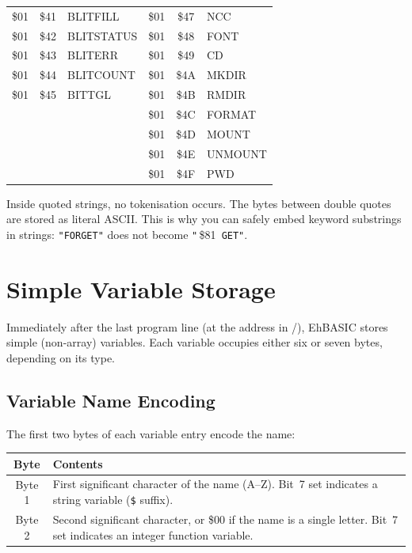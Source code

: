 \begin{center}
\begin{longtable}{ccl|ccl}
\$01 & \$41 & BLITFILL    & \$01 & \$47 & NCC         \\
\$01 & \$42 & BLITSTATUS  & \$01 & \$48 & FONT        \\
\$01 & \$43 & BLITERR     & \$01 & \$49 & CD          \\
\$01 & \$44 & BLITCOUNT   & \$01 & \$4A & MKDIR       \\
\$01 & \$45 & BITTGL      & \$01 & \$4B & RMDIR       \\
     &      &             & \$01 & \$4C & FORMAT      \\
     &      &             & \$01 & \$4D & MOUNT       \\
     &      &             & \$01 & \$4E & UNMOUNT     \\
     &      &             & \$01 & \$4F & PWD         \\
\bottomrule
\end{longtable}
\end{center}

\begin{notebox}
Inside quoted strings, no tokenisation occurs.  The bytes between double
quotes are stored as literal ASCII.  This is why you can safely embed keyword
substrings in strings: \texttt{"FORGET"} does not become \texttt{"}\,\$81\,%
\texttt{GET"}.
\end{notebox}

\section{Simple Variable Storage}

Immediately after the last program line (at the address in
/), EhBASIC stores simple (non-array) variables.  Each
variable occupies either six or seven bytes, depending on its type.

\subsection{Variable Name Encoding}

The first two bytes of each variable entry encode the name:

\begin{center}
\begin{tabular}{cp{28em}}
\toprule
\textbf{Byte} & \textbf{Contents} \\
\midrule
Byte 1 & First significant character of the name (A--Z).
         Bit~7 set indicates a string variable (\texttt{\$} suffix). \\
Byte 2 & Second significant character, or \$00 if the name is a single
         letter.  Bit~7 set indicates an integer function variable. \\
\bottomrule
\end{tabular}
\end{center}

